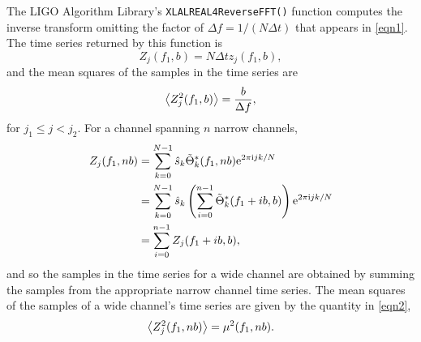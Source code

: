 \documentclass[10pt]{article}
\begin{document}
The LIGO Algorithm Library's \texttt{XLALREAL4ReverseFFT()} function
computes the inverse transform omitting the factor of \(\Delta f = 1 / (N
\Delta t)\) that appears in \eqref{eqn1}.  The time series returned by this
function is
\begin{equation}
Z_{j}(f_{1}, b)
   = N \Delta t z_{j}(f_{1}, b),
\end{equation}
and the mean squares of the samples in the time series are
\begin{equation}
\left\langle Z_{j}^{2}(f_{1}, b)\right\rangle
   = \frac{b}{\Delta f},
\end{equation}
for \(j_{1} \leq j < j_{2}\).  For a channel spanning \(n\) narrow
channels,
\begin{align}
Z_{j}(f_{1}, n b)
   & = \sum_{k = 0}^{N - 1} \hat{s}_{k} \tilde{\Theta}^{*}_{k}(f_{1}, n
   b) \mathrm{e}^{2 \pi \mathrm{i} j k / N}
   \\
   & = \sum_{k = 0}^{N - 1} \hat{s}_{k} \left( \sum_{i = 0}^{n - 1}
   \tilde{\Theta}^{*}_{k}(f_{1} + i b, b) \right) \mathrm{e}^{2 \pi \mathrm{i} j k /
   N}
   \\
   & = \sum_{i = 0}^{n - 1} Z_{j}(f_{1} + i b, b),
\end{align}
and so the samples in the time series for a wide channel are obtained by
summing the samples from the appropriate narrow channel time series.  The
mean squares of the samples of a wide channel's time series are given by
the quantity in \eqref{eqn2},
\begin{equation}
\left\langle Z_{j}^{2}(f_{1}, n b)\right\rangle
   = \mu^{2}(f_{1}, n b).
\end{equation}
\end{document}
